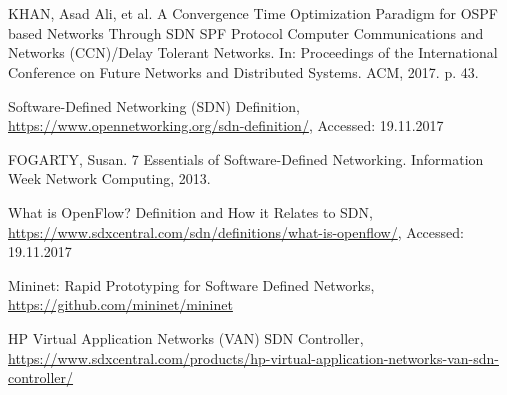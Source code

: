 \documentclass[conference]{IEEEtran}
\begin{document}
\section{}







\ifCLASSOPTIONcaptionsoff
  \newpage
\fi


\begin{thebibliography}{1}
KHAN, Asad Ali, et al. A Convergence Time Optimization Paradigm for OSPF based Networks Through SDN SPF Protocol Computer Communications and Networks (CCN)/Delay Tolerant Networks. In: Proceedings of the International Conference on Future Networks and Distributed Systems. ACM, 2017. p. 43.

Software-Defined Networking (SDN) Definition, \url{https://www.opennetworking.org/sdn-definition/}, Accessed: 19.11.2017

FOGARTY, Susan. 7 Essentials of Software-Defined Networking. Information Week Network Computing, 2013.

What is OpenFlow? Definition and How it Relates to SDN, \url{https://www.sdxcentral.com/sdn/definitions/what-is-openflow/},  Accessed: 19.11.2017

Mininet: Rapid Prototyping for Software Defined Networks, \url{https://github.com/mininet/mininet}

HP Virtual Application Networks (VAN) SDN Controller, \url{https://www.sdxcentral.com/products/hp-virtual-application-networks-van-sdn-controller/}

\end{thebibliography}
\end{document}
